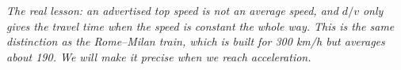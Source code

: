 \documentclass[12pt, twoside]{article}
\begin{document}
\begin{enumerate}[itemsep=0.25cm]
\begin{enumerate}[itemsep=0.3cm]
      \emph{The real lesson: an advertised top speed is not an average speed, and $d/v$
      only gives the travel time when the speed is constant the whole way. This is the same
      distinction as the Rome--Milan train, which is built for 300 km/h but averages about
      190. We will make it precise when we reach acceleration.}
  \end{enumerate}

\end{enumerate}
\end{document}
